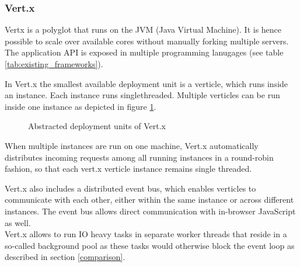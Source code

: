 %


\subsubsection{Vert.x}
\label{vert.x}

Vertx is a polyglot that runs on the JVM (Java Virtual Machine). It is hence
possible to scale over available cores without manually forking multiple
servers.\\
The application API is exposed in multiple programming lanugages (see table
\ref{tab:existing_frameworks}).

In Vert.x the smallest available deployment unit is a verticle, which runs
inside an instance. Each instance runs singlethreaded.
Multiple verticles can be run inside one instance as depicted in figure
\ref{fig:vertx_constructs}.

\begin{figure}[h]
	\centering
	\setlength\fboxsep{2pt}
	\caption{Abstracted deployment units of Vert.x}
	\label{fig:vertx_constructs}
\end{figure}

When multiple instances are run on one machine, Vert.x automatically distributes incoming
requests among all running instances in a round-robin fashion, so that each
vert.x verticle instance remains single threaded.

Vert.x also includes a distributed event bus, which enables verticles to
communicate with each other, either within the same instance or across different
instances. The event bus allows direct communication with in-browser JavaScript as well.\\
Vert.x allows to run IO heavy tasks in separate worker threads that reside in a
so-called background pool as these tasks would otherwise block the event loop as
described in section \ref{comparison}.

